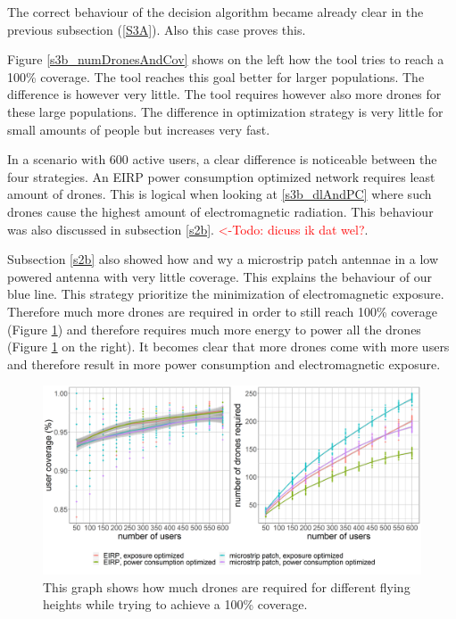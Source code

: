The correct behaviour of the decision algorithm became already clear in the previous subsection (\ref{S3A}). Also this 
case proves this.

Figure \ref{s3b_numDronesAndCov} shows on the left how the tool tries to reach a 100\% coverage. The tool reaches this goal 
better for larger populations. The difference is however very little. The tool requires however also more drones for these large 
populations. The difference in optimization strategy is very little for small amounts of people but increases very fast. 

In a scenario with 600 active users, a clear difference is noticeable between the four strategies. An EIRP power consumption optimized 
network requires least amount of drones. This is logical when looking at \ref{s3b_dlAndPC} where such drones cause the highest amount of 
electromagnetic radiation. This behaviour was also discussed in subsection \ref{s2b}. \textcolor{red}{<-Todo: dicuss ik dat wel?}.

Subsection \ref{s2b} also showed how and wy a microstrip patch antennae in a low powered antenna with very little coverage. This 
explains the behaviour of our blue line. This strategy prioritize the minimization of electromagnetic exposure. Therefore much more 
drones are required in order to still reach 100\% coverage (Figure \ref{fig:s3b_numDronesAndCov}) and therefore requires much more energy 
to power all the drones (Figure \ref{fig:s3b_numDronesAndCov} on the right).
It becomes clear that more drones come with more users  and therefore result in more power consumption and electromagnetic exposure.

\begin{figure}[]
  \includegraphics[width=\textwidth]{../results/s3/uvsnumdronesAndCov.png}
  \caption{This graph shows how much drones are required for different flying heights while trying to achieve a 100\% coverage.}
  \label{fig:s3b_numDronesAndCov}
\end{figure}



